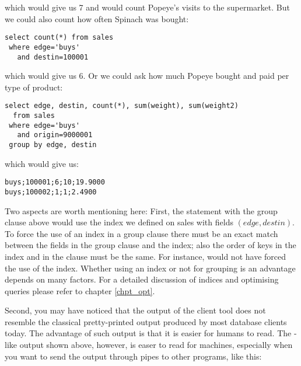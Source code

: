 
which would give us 7 and would count Popeye's visits to the supermarket.
But we could also count how often Spinach was bought:

\begin{sqlcode}
\begin{lstlisting}
select count(*) from sales
 where edge='buys'
   and destin=100001
\end{lstlisting}
\end{sqlcode}

which would give us 6.
Or we could ask how much Popeye bought and paid per type of product:

\begin{sqlcode}
\begin{lstlisting}
select edge, destin, count(*), sum(weight), sum(weight2)
  from sales 
 where edge='buys' 
   and origin=9000001 
 group by edge, destin
\end{lstlisting}
\end{sqlcode}

which would give us:

\begin{verbatim}
buys;100001;6;10;19.9000
buys;100002;1;1;2.4900
\end{verbatim}

Two aspects are worth mentioning here:
First, the statement with the group clause above
would use the index we defined on sales
with fields $(edge, destin)$.
To force the use of an index in a group clause
there must be an exact match between the fields
in the group clause and the index; also the order
of keys in the index and in the clause must be the same.
For instance,  would
not have forced the use of the index.
Whether using an index or not for grouping
is an advantage 
depends on many factors.
For a detailed discussion of indices and
optimising queries please refer to chapter \ref{chpt_opt}.

Second, you may have noticed that the output
of the client tool does not resemble the classical
pretty-printed output produced by most database
clients today. The advantage of such output is
that it is easier for humans to read.
The -like output shown above, however,
is easer to read for machines, especially
when you want to send the output through pipes
to other programs, like this:

